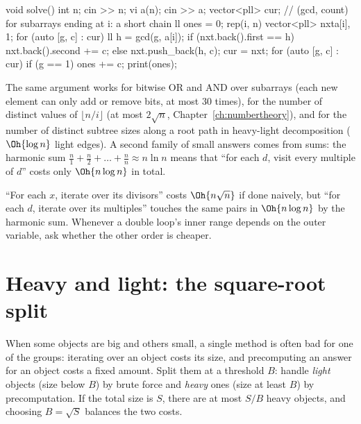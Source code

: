 \begin{code}
void solve() {
    int n;
    cin >> n;
    vi a(n);
    cin >> a;
    vector<pll> cur;  // (gcd, count) for subarrays ending at i: a short chain
    ll ones = 0;
    rep(i, n) {
        vector<pll> nxt{{a[i], 1}};
        for (auto [g, c] : cur) {
            ll h = gcd(g, a[i]);
            if (nxt.back().first == h) nxt.back().second += c;
            else nxt.push_back({h, c});
        }
        cur = nxt;
        for (auto [g, c] : cur)
            if (g == 1) ones += c;
    }
    print(ones);
}
\end{code}

The same argument works for bitwise OR and AND over subarrays (each new element can only add or remove bits, at most 30
times), for the number of distinct values of $\lfloor n / i \rfloor$ (at most $2\sqrt n$, Chapter~\ref{ch:numbertheory}), and
for the number of distinct subtree sizes along a root path in heavy-light decomposition ($\Oh{\log n}$ light edges). A
second family of small answers comes from sums: the harmonic sum $\frac n1 + \frac n2 + \dots + \frac nn \approx n \ln n$
means that ``for each $d$, visit every multiple of $d$'' costs only $\Oh{n \log n}$ in total.

\begin{trick}
``For each $x$, iterate over its divisors'' costs $\Oh{n\sqrt n}$ if done naively, but ``for each $d$, iterate over its
multiples'' touches the same pairs in $\Oh{n \log n}$ by the harmonic sum. Whenever a double loop's inner range depends on
the outer variable, ask whether the other order is cheaper.
\end{trick}

\section[Heavy and light]{Heavy and light: the square-root split \hfill \plat}\label{sec:heavylight}

When some objects are big and others small, a single method is often bad for one of the groups: iterating over an object
costs its size, and precomputing an answer for an object costs a fixed amount. Split them at a threshold $B$: handle
\emph{light} objects (size below $B$) by brute force and \emph{heavy} ones (size at least $B$) by precomputation. If the
total size is $S$, there are at most $S / B$ heavy objects, and choosing $B = \sqrt S$ balances the two costs.


